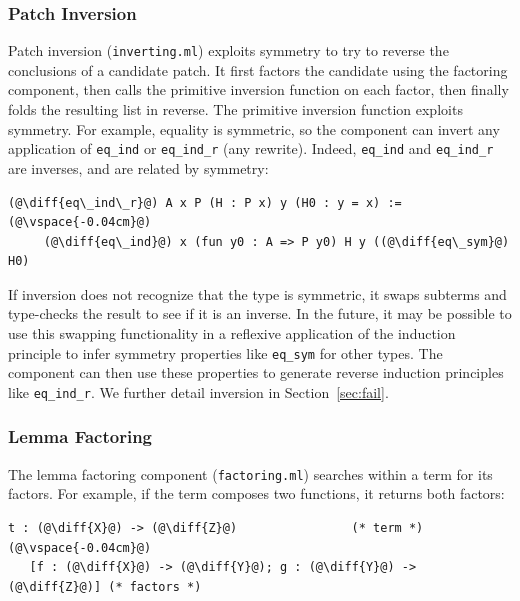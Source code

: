 \subsubsection{Patch Inversion} Patch inversion (\lstinline{inverting.ml}) exploits symmetry to try to reverse the conclusions of a 
candidate patch.
It first factors the candidate using the factoring component, then calls the primitive inversion
function on each factor, then finally folds the resulting list in reverse.
The primitive inversion function exploits symmetry. 
For example, equality is symmetric, so the component can invert any application of \lstinline{eq_ind} or \lstinline{eq_ind_r}
(any rewrite). Indeed, \lstinline{eq_ind} and \lstinline{eq_ind_r} are inverses, and are related by symmetry:

\begin{lstlisting}[language=coq]
   (@\diff{eq\_ind\_r}@) A x P (H : P x) y (H0 : y = x) :=(@\vspace{-0.04cm}@)
     (@\diff{eq\_ind}@) x (fun y0 : A => P y0) H y ((@\diff{eq\_sym}@) H0)	
\end{lstlisting}

If inversion does not recognize that the type is symmetric, it
swaps subterms and type-checks the result to see if it is an inverse.
In the future, it may be possible to use this swapping functionality
in a reflexive application of the induction principle to infer
symmetry properties like \lstinline{eq_sym} for other types. The component can then use these properties 
to generate reverse induction principles like \lstinline{eq_ind_r}. 
We further detail inversion in Section~\ref{sec:fail}.

\subsubsection{Lemma Factoring} The lemma factoring component (\lstinline{factoring.ml}) searches within a term
for its factors. For example,
if the term composes two functions, it returns both factors:

\begin{lstlisting}[language=coq]
    t : (@\diff{X}@) -> (@\diff{Z}@)                (* term *)(@\vspace{-0.04cm}@)
   [f : (@\diff{X}@) -> (@\diff{Y}@); g : (@\diff{Y}@) -> (@\diff{Z}@)] (* factors *)
\end{lstlisting}


